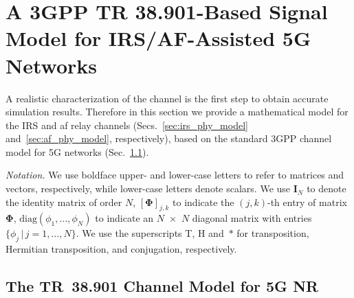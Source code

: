  
\section{A 3GPP TR 38.901-Based Signal Model for IRS/AF-Assisted 5G Networks} 
\label{sec:ch_model_ext}


A realistic characterization of the channel is the first step to obtain accurate simulation results. 
Therefore in this section we provide a mathematical model for the IRS and \gls{af} relay channels  (Secs.~\ref{sec:irs_phy_model} and~\ref{sec:af_phy_model}, respectively), based on the standard 3GPP channel model for 5G networks (Sec.~\ref{sec:baseline_model}). %

\emph{Notation.} We use boldface upper- and lower-case letters to refer to matrices and vectors, respectively, while lower-case letters denote scalars. We use $\bm{I}_{N}$ to denote the identity matrix of order $N$, $[ \bm{\Phi} ]_{j, k}$ to indicate the $(j, k)$-th
entry of matrix $\bm{\Phi}$, $\mathrm{diag} ( \phi_1,\dots, \phi_N) $ to indicate an  $N$~$\times$~$N$ diagonal matrix with entries $\{\phi_j \, | \, j=1, \dots, N \}$. We use the superscripts T, H and~$*$ for transposition, Hermitian transposition, and conjugation, respectively.





\subsection{The TR~38.901 Channel Model for 5G NR}
 \label{sec:baseline_model}

